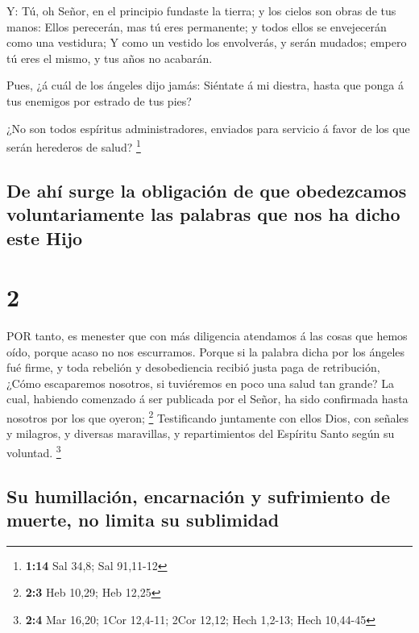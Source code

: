  Y: Tú, oh Señor, en el principio fundaste la tierra; y los
cielos son obras de tus manos:  Ellos perecerán, mas tú
eres permanente; y todos ellos se envejecerán como una vestidura;
 Y como un vestido los envolverás, y serán mudados; empero
tú eres el mismo, y tus años no acabarán.

 Pues, ¿á cuál de los ángeles dijo jamás: Siéntate á mi
diestra, hasta que ponga á tus enemigos por estrado de tus pies?

 ¿No son todos espíritus administradores, enviados para
servicio á favor de los que serán herederos de salud? \footnote{\textbf{1:14}
  Sal 34,8; Sal 91,11-12}

\hypertarget{de-ahuxed-surge-la-obligaciuxf3n-de-que-obedezcamos-voluntariamente-las-palabras-que-nos-ha-dicho-este-hijo}{%
\subsection{De ahí surge la obligación de que obedezcamos
voluntariamente las palabras que nos ha dicho este
Hijo}\label{de-ahuxed-surge-la-obligaciuxf3n-de-que-obedezcamos-voluntariamente-las-palabras-que-nos-ha-dicho-este-hijo}}

\hypertarget{section-1}{%
\section{2}\label{section-1}}

 POR tanto, es menester que con más diligencia atendamos á
las cosas que hemos oído, porque acaso no nos escurramos. 
Porque si la palabra dicha por los ángeles fué firme, y toda rebelión y
desobediencia recibió justa paga de retribución,  ¿Cómo
escaparemos nosotros, si tuviéremos en poco una salud tan grande? La
cual, habiendo comenzado á ser publicada por el Señor, ha sido
confirmada hasta nosotros por los que oyeron; \footnote{\textbf{2:3} Heb
  10,29; Heb 12,25}  Testificando juntamente con ellos Dios,
con señales y milagros, y diversas maravillas, y repartimientos del
Espíritu Santo según su voluntad. \footnote{\textbf{2:4} Mar 16,20; 1Cor
  12,4-11; 2Cor 12,12; Hech 1,2-13; Hech 10,44-45}

\hypertarget{su-humillaciuxf3n-encarnaciuxf3n-y-sufrimiento-de-muerte-no-limita-su-sublimidad}{%
\subsection{Su humillación, encarnación y sufrimiento de muerte, no
limita su
sublimidad}\label{su-humillaciuxf3n-encarnaciuxf3n-y-sufrimiento-de-muerte-no-limita-su-sublimidad}}

